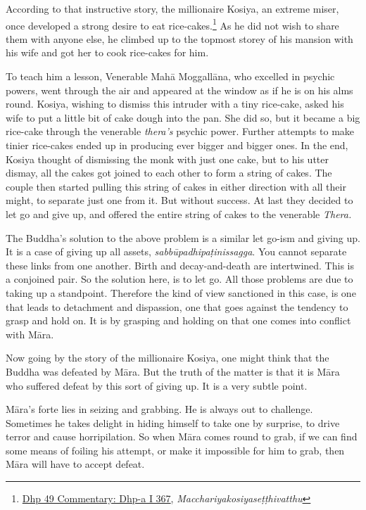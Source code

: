 According to that instructive story, the millionaire Kosiya, an extreme miser, once developed a strong desire to eat rice-cakes.\footnote{\href{https://www.digitalpalireader.online/_dprhtml/index.html?loc=k.1.0.0.4.4.0.a}{Dhp 49 Commentary: Dhp-a I 367}, \emph{Macchariyakosiyaseṭṭhivatthu}} As he did not wish to share them with anyone else, he climbed up to the topmost storey of his mansion with his wife and got her to cook rice-cakes for him.

To teach him a lesson, Venerable Mahā Moggallāna, who excelled in psychic powers, went through the air and appeared at the window as if he is on his alms round. Kosiya, wishing to dismiss this intruder with a tiny rice-cake, asked his wife to put a little bit of cake dough into the pan. She did so, but it became a big rice-cake through the venerable \emph{thera's} psychic power. Further attempts to make tinier rice-cakes ended up in producing ever bigger and bigger ones. In the end, Kosiya thought of dismissing the monk with just one cake, but to his utter dismay, all the cakes got joined to each other to form a string of cakes. The couple then started pulling this string of cakes in either direction with all their might, to separate just one from it. But without success. At last they decided to let go and give up, and offered the entire string of cakes to the venerable \emph{Thera.}

The Buddha's solution to the above problem is a similar let go-ism and giving up. It is a case of giving up all assets, \emph{sabbūpadhipaṭinissagga}. You cannot separate these links from one another. Birth and decay-and-death are intertwined. This is a conjoined pair. So the solution here, is to let go. All those problems are due to taking up a standpoint. Therefore the kind of view sanctioned in this case, is one that leads to detachment and dispassion, one that goes against the tendency to grasp and hold on. It is by grasping and holding on that one comes into conflict with Māra.

Now going by the story of the millionaire Kosiya, one might think that the Buddha was defeated by Māra. But the truth of the matter is that it is Māra who suffered defeat by this sort of giving up. It is a very subtle point.

Māra's forte lies in seizing and grabbing. He is always out to challenge. Sometimes he takes delight in hiding himself to take one by surprise, to drive terror and cause horripilation. So when Māra comes round to grab, if we can find some means of foiling his attempt, or make it impossible for him to grab, then Māra will have to accept defeat.

